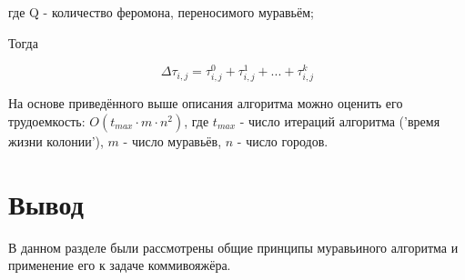 где \quad Q - количество феромона, переносимого муравьём;


Тогда

\begin{equation}\label{form:add1} 
	\Delta \tau _{i,j}= \tau _{i,j}^0 + \tau _{i,j}^1 + ... + \tau _{i,j}^k
\end{equation}


На основе приведённого выше описания алгоритма можно оценить его трудоемкость: $O(t_{max} \cdot m \cdot n^2)$, где $t_{max}$ - число итераций алгоритма ('время жизни колонии'), $m$ - число муравьёв, $n$ - число городов.



\section*{Вывод}
В данном разделе были рассмотрены общие принципы муравьиного алгоритма и применение его к задаче коммивояжёра. 
